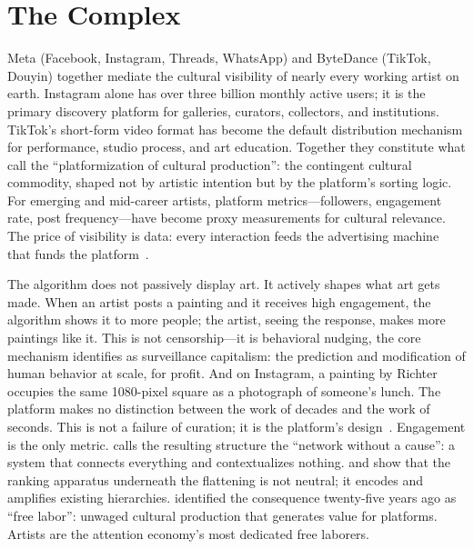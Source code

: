 \documentclass[10pt,letterpaper,twocolumn]{article}
\begin{document}
\section{The Complex}

Meta (Facebook, Instagram, Threads, WhatsApp) and ByteDance (TikTok, Douyin) together mediate the cultural visibility of nearly every working artist on earth. Instagram alone has over three billion monthly active users; it is the primary discovery platform for galleries, curators, collectors, and institutions. TikTok's short-form video format has become the default distribution mechanism for performance, studio process, and art education. Together they constitute what \citet{nieborg2018platformization} call the ``platformization of cultural production'': the contingent cultural commodity, shaped not by artistic intention but by the platform's sorting logic. For emerging and mid-career artists, platform metrics---followers, engagement rate, post frequency---have become proxy measurements for cultural relevance. The price of visibility is data: every interaction feeds the advertising machine that funds the platform~\citep{zuboff2019surveillance, srnicek2017platform}.

The algorithm does not passively display art. It actively shapes what art gets made. When an artist posts a painting and it receives high engagement, the algorithm shows it to more people; the artist, seeing the response, makes more paintings like it. This is not censorship---it is behavioral nudging, the core mechanism \citet{zuboff2019surveillance} identifies as surveillance capitalism: the prediction and modification of human behavior at scale, for profit. And on Instagram, a painting by Richter occupies the same 1080-pixel square as a photograph of someone's lunch. The platform makes no distinction between the work of decades and the work of seconds. This is not a failure of curation; it is the platform's design~\citep{chun2016updating}. Engagement is the only metric. \citet{lovink2011networks} calls the resulting structure the ``network without a cause'': a system that connects everything and contextualizes nothing. \citet{noble2018algorithms} and \citet{benjamin2019race} show that the ranking apparatus underneath the flattening is not neutral; it encodes and amplifies existing hierarchies. \citet{terranova2000free} identified the consequence twenty-five years ago as ``free labor'': unwaged cultural production that generates value for platforms. Artists are the attention economy's most dedicated free laborers.
\end{document}
